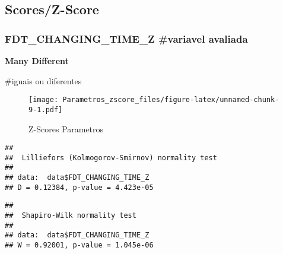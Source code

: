 \documentclass[
]{article}
\newenvironment{Shaded}{\begin{snugshade}}{\end{snugshade}}
\newcommand{\AttributeTok}[1]{\textcolor[rgb]{0.13,0.29,0.53}{#1}}
\newcommand{\DecValTok}[1]{\textcolor[rgb]{0.00,0.00,0.81}{#1}}
\newcommand{\FunctionTok}[1]{\textcolor[rgb]{0.13,0.29,0.53}{\textbf{#1}}}
\newcommand{\NormalTok}[1]{#1}
\newcommand{\SpecialCharTok}[1]{\textcolor[rgb]{0.81,0.36,0.00}{\textbf{#1}}}
\newcommand{\StringTok}[1]{\textcolor[rgb]{0.31,0.60,0.02}{#1}}
\begin{document}
\subsection{\texorpdfstring{\textbf{Scores/Z-Score}}{Scores/Z-Score}}\label{scoresz-score-7}

\subsubsection{FDT\_CHANGING\_TIME\_Z \#variavel
avaliada}\label{fdt_changing_time_z-variavel-avaliada}

\textbf{Many Different}

\#iguais ou diferentes

\begin{Shaded}
\end{Shaded}

\begin{figure}
\centering
\texttt{[image: Parametros\_zscore\_files/figure-latex/unnamed-chunk-9-1.pdf]}
\caption{Z-Scores Parametros}
\end{figure}

\begin{Shaded}
\end{Shaded}

\begin{verbatim}
## 
##  Lilliefors (Kolmogorov-Smirnov) normality test
## 
## data:  data$FDT_CHANGING_TIME_Z
## D = 0.12384, p-value = 4.423e-05
\end{verbatim}

\begin{Shaded}
\end{Shaded}

\begin{verbatim}
## 
##  Shapiro-Wilk normality test
## 
## data:  data$FDT_CHANGING_TIME_Z
## W = 0.92001, p-value = 1.045e-06
\end{verbatim}
\end{document}
